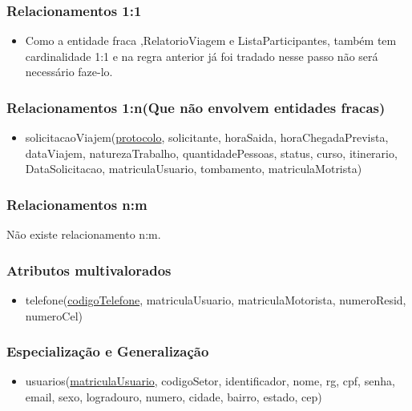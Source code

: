 \documentclass[11pt]{article}
\begin{document}
\subsubsection{Relacionamentos 1:1}
\begin{itemize}

\item Como a entidade fraca ,RelatorioViagem e ListaParticipantes, também tem cardinalidade 1:1 e na regra anterior já foi tradado nesse passo não será necessário faze-lo.
\end{itemize}

\subsubsection{Relacionamentos 1:n(Que não envolvem entidades fracas)}
\begin{itemize}

\item solicitacaoViajem(\underline{protocolo}, solicitante, horaSaida, horaChegadaPrevista, dataViajem, naturezaTrabalho, quantidadePessoas, status, curso, itinerario, DataSolicitacao, matriculaUsuario, tombamento, matriculaMotrista)

\end{itemize}

\subsubsection{Relacionamentos n:m}
Não existe relacionamento n:m.

\subsubsection{Atributos multivalorados}
\begin{itemize}

\item telefone(\underline{codigoTelefone}, matriculaUsuario, matriculaMotorista, numeroResid, numeroCel)

\end{itemize}

\subsubsection{Especialização e Generalização}

\begin{itemize}

\item usuarios(\underline{matriculaUsuario}, codigoSetor, identificador, nome, rg, cpf, senha,
email, sexo, logradouro, numero, cidade, bairro, estado, cep)

\end{itemize}
\end{document}
